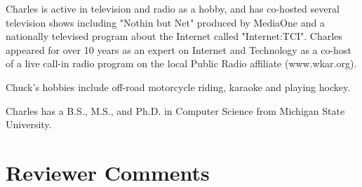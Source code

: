 \documentclass[12pt]{book}
\begin{document}
Charles is active in television and radio as a hobby, and has co-hosted several television shows including "Nothin but Net" produced by MediaOne and a nationally televised program about the Internet called "Internet:TCI". Charles appeared for over 10 years as an expert on Internet and Technology as a co-host of a live call-in radio program on the local Public Radio affiliate (www.wkar.org).

Chuck's hobbies include off-road motorcycle riding, karaoke and playing hockey.

Charles has a B.S., M.S., and Ph.D. in Computer Science from Michigan State University.

\newpage

\section*{Reviewer Comments}
\end{document}

